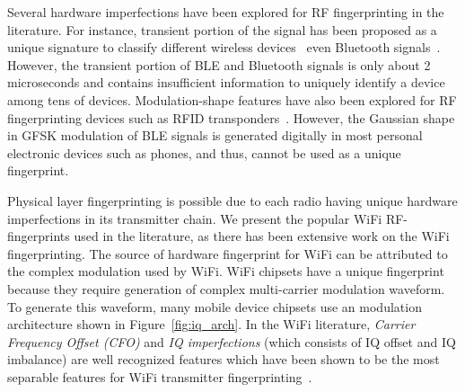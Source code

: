 Several hardware imperfections have been explored for RF fingerprinting in the literature. 
For instance, transient portion of the signal has been proposed as a unique signature to 
classify different wireless devices~\cite{extraction_rehman, transientID_danev} even Bluetooth
signals~\cite{transientBT_Hall}. However, the transient portion of BLE and Bluetooth signals
is only about 2 microseconds and contains insufficient information to uniquely identify 
a device among tens of devices. Modulation-shape features have also been explored for RF
fingerprinting devices such as RFID transponders~\cite{rfidphysical_danev}. However, 
the Gaussian shape in GFSK modulation of BLE signals is generated digitally in most 
personal electronic devices such as phones, and thus, cannot be used as a unique fingerprint.
\fi


Physical layer fingerprinting is possible due to each radio having unique
hardware imperfections in its transmitter chain. We present the popular WiFi RF-fingerprints
used in the literature, as there has been extensive work on the WiFi fingerprinting. 
The source of hardware fingerprint for WiFi can be attributed to the complex modulation used by WiFi. 
%
WiFi chipsets have a unique fingerprint because they require generation of
complex multi-carrier modulation waveform. To generate this waveform, many
mobile device chipsets use an \iq modulation architecture shown in
Figure~\ref{fig:iq_arch}.
%
In the WiFi literature, \emph{Carrier Frequency Offset (CFO)} and \emph{IQ imperfections} (which
consists of IQ offset and IQ imbalance) are well recognized features which have been shown to be the most separable features for 
WiFi transmitter fingerprinting~\cite{Brik_radiometric}. 


